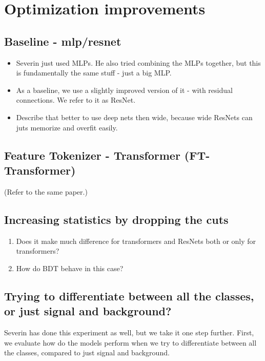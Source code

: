 \section{Optimization improvements}


\subsection{Baseline - mlp/resnet}

\begin{itemize}
    \item Severin just used MLPs. He also tried combining the MLPs together, but this is fundamentally the same stuff -
          just a big MLP.
    \item As a baseline, we use a slightly improved version of it - with residual connections. We refer to it as ResNet.
    \item Describe that better to use deep nets then wide, because wide ResNets can juts memorize and overfit easily.
\end{itemize}


\subsection{Feature Tokenizer - Transformer (FT-Transformer)}

(Refer to the same paper.)


\subsection{Increasing statistics by dropping the cuts}

\begin{enumerate}
    \item Does it make much difference for transformers and ResNets both or only for transformers?
    \item How do BDT behave in this case?
\end{enumerate}

\subsection{Trying to differentiate between all the classes, or just signal and background?}

Severin has done this experiment as well, but we take it one step further. First, we evaluate how do the models perform
when we try to differentiate between all the classes, compared to just signal and background.

